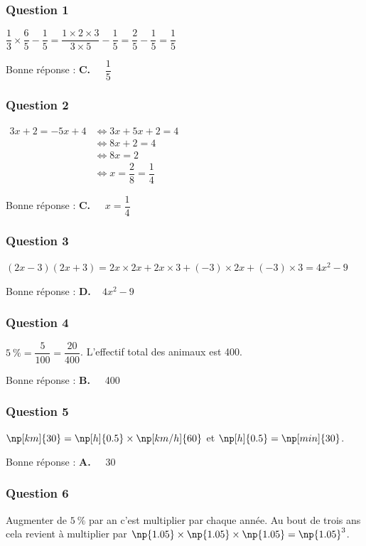 \subsubsection*{Question 1}

$\dfrac{1}{3} \times \dfrac{6}{5}-\dfrac{1}{5} =  \dfrac{1 \times 2 \times 3}{3 \times 5} - \dfrac{1}{5} = \dfrac{2}{5} - \dfrac{1}{5} = \dfrac{1}{5}$

Bonne réponse : \textbf{C.~~} $\dfrac{1}{5}$


\subsubsection*{Question 2}

$\begin{aligned}
	3 x+2= -5 x+4
	&\iff 3x + 5x + 2 = 4 \\
	&\iff  8x + 2 =  4  \\
	&\iff  8x  =  2 \\
	&\iff x = \dfrac{2}{8} = \dfrac{1}{4}
\end{aligned}$

Bonne réponse : \textbf{C.~~} $x= \dfrac{1}{4}$

\subsubsection*{Question 3}

$(2x - 3)(2x + 3) = 2x\times 2x + 2x\times 3 + (-3)\times 2x + (-3)\times 3 = 4x^2 - 9$

Bonne réponse : \textbf{D.~~}$4x^2 - 9$

\subsubsection*{Question 4}

$5~\% = \dfrac{5}{100} = \dfrac{20}{400}$. L'effectif total des animaux est 400.

Bonne réponse : \textbf{B.~~} 400

\subsubsection*{Question 5}
$\np[km]{30} = \np[h]{0.5} \times \np[km/h]{60}$ et $\np[h]{0.5} = \np[min]{30}$.

Bonne réponse : \textbf{A.~~} 30

\subsubsection*{Question 6}
Augmenter de $5~\%$ par an c'est multiplier par  chaque année. Au bout de trois ans cela revient à multiplier par $\np{1.05}\times\np{1.05}\times\np{1.05} = \np{1.05}^3$.

